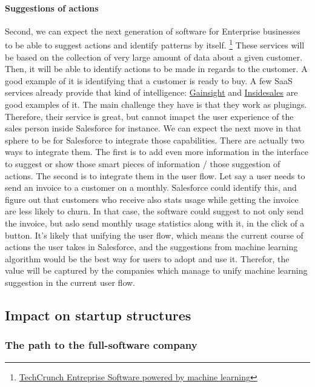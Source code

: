 \documentclass[12pt]{article}
\begin{document}
\paragraph{Suggestions of actions}

Second, we can expect the next generation of software for Enterprise businesses
to be able to suggest actions and identify patterns by itself.
\footnote{\href{http://techcrunch.com/2015/07/27/the-next-wave-of-enterprise-software-powered-by-machine-learning}
{TechCrunch Entreprise Software powered by machine learning}}
These services will be based on the collection of very large amount of data about
a given customer. Then, it will be able to identify actions to be made in regards
to the customer. A good example of it is identifying that a customer is ready to
buy. A few SaaS services already provide that kind of intelligence:
\href{http://www.gainsight.com/}{Gainsight} and
\href{http://uk.insidesales.com/}{Insidesales} are good examples of it.
The main challenge they have is that they work as plugings. Therefore, their
service is great, but cannot imapct the user experience of the sales person
inside Salesforce for instance.
We can expect the next move in that sphere to be for Salesforce to integrate
those capabilities. There are actually two ways to integrate them. The first
is to add even more information in the interface to suggest or show those smart
pieces of information / those suggestion of actions. The second is to integrate
them in the user flow. Let say a user needs to send an invoice to a customer on
a monthly. Salesforce could identify this, and figure out that customers who
receive also stats usage while getting the invoice are less likely to churn. In
that case, the software could suggest to not only send the invoice, but aslo
send monthly usage statistics along with it, in the click of a button.
It's likely that unifying the user flow, which means the current course of
actions the user takes in Salesforce, and the suggestions from machine learning
algorithm would be the best way for users to adopt and use it. Therefor, the
value will be captured by the companies which manage to unify machine learning
suggestion in the current user flow.

\subsection{Impact on startup structures}

\subsubsection{The path to the full-software company}
\end{document}
